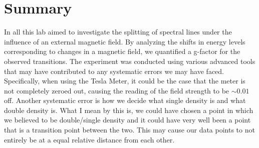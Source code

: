 \documentclass[a4paper,12pt,english]{all-in-one} %
\begin{document}
\section*{Summary}
{
In all this lab aimed to investigate the splitting of spectral lines under the influence of an external magnetic field. By analyzing the shifts in energy levels corresponding to changes in a magnetic field, we quantified a g-factor for the observed transitions. The experiment was conducted using various advanced tools that may have contributed to any systematic errors we may have faced. Specifically, when using the Tesla Meter, it could be the case that the meter is not completely zeroed out, causing the reading of the field strength to be $\sim0.01$ off. Another systematic error is how we decide what single density is and what double density is. What I mean by this is, we could have chosen a point in which we believed to be double/single density and it could have very well been a point that is a transition point between the two. This may cause our data points to not entirely be at a equal relative distance from each other.
}
\end{document}
